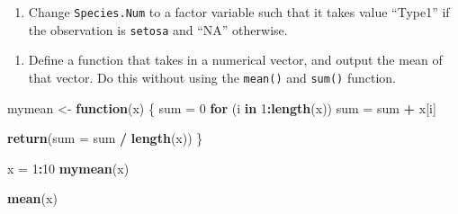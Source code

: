 \documentclass[
]{book}
\newenvironment{Shaded}{\begin{snugshade}}{\end{snugshade}}
\newcommand{\AttributeTok}[1]{\textcolor[rgb]{0.13,0.29,0.53}{#1}}
\newcommand{\ControlFlowTok}[1]{\textcolor[rgb]{0.13,0.29,0.53}{\textbf{#1}}}
\newcommand{\DecValTok}[1]{\textcolor[rgb]{0.00,0.00,0.81}{#1}}
\newcommand{\FunctionTok}[1]{\textcolor[rgb]{0.13,0.29,0.53}{\textbf{#1}}}
\newcommand{\NormalTok}[1]{#1}
\newcommand{\OtherTok}[1]{\textcolor[rgb]{0.56,0.35,0.01}{#1}}
\newcommand{\SpecialCharTok}[1]{\textcolor[rgb]{0.81,0.36,0.00}{\textbf{#1}}}
\newcommand{\StringTok}[1]{\textcolor[rgb]{0.31,0.60,0.02}{#1}}
\providecommand{\tightlist}{%
  \setlength{\itemsep}{0pt}\setlength{\parskip}{0pt}}
\theoremstyle{definition}
\theoremstyle{definition}
\theoremstyle{definition}
\theoremstyle{definition}
\theoremstyle{remark}
\begin{document}
\begin{Shaded}
\end{Shaded}

\begin{enumerate}
\def\labelenumi{\arabic{enumi}.}
\setcounter{enumi}{2}
\tightlist
\item
  Change \texttt{Species.Num} to a factor variable such that it takes value ``Type1'' if the observation is \texttt{setosa} and ``NA'' otherwise.
\end{enumerate}

\begin{Shaded}
\end{Shaded}

\begin{enumerate}
\def\labelenumi{\arabic{enumi}.}
\setcounter{enumi}{3}
\tightlist
\item
  Define a function that takes in a numerical vector, and output the mean of that vector. Do this without using the \texttt{mean()} and \texttt{sum()} function.
\end{enumerate}

\begin{Shaded}
\begin{Highlighting}[]
\NormalTok{  mymean }\OtherTok{\textless{}{-}} \ControlFlowTok{function}\NormalTok{(x)}
\NormalTok{  \{}
\NormalTok{    sum }\OtherTok{=} \DecValTok{0}
    \ControlFlowTok{for}\NormalTok{ (i }\ControlFlowTok{in} \DecValTok{1}\SpecialCharTok{:}\FunctionTok{length}\NormalTok{(x))}
\NormalTok{      sum }\OtherTok{=}\NormalTok{ sum }\SpecialCharTok{+}\NormalTok{ x[i]}
    
    \FunctionTok{return}\NormalTok{(}\AttributeTok{sum =}\NormalTok{ sum }\SpecialCharTok{/} \FunctionTok{length}\NormalTok{(x))}
\NormalTok{  \}}
  
\NormalTok{  x }\OtherTok{=} \DecValTok{1}\SpecialCharTok{:}\DecValTok{10}
  \FunctionTok{mymean}\NormalTok{(x)}
  
  \FunctionTok{mean}\NormalTok{(x)}
\end{Highlighting}
\end{Shaded}
\end{document}
